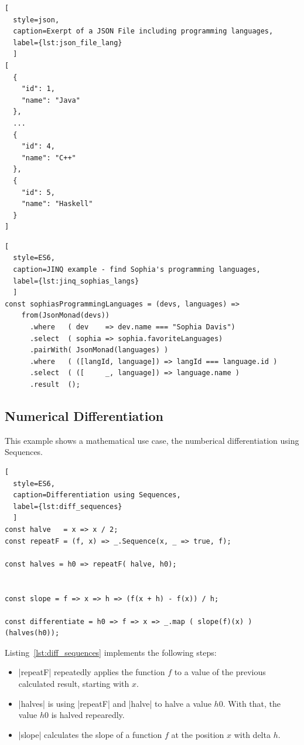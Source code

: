 \begin{lstlisting}[
  style=json, 
  caption=Exerpt of a JSON File including programming languages,
  label={lst:json_file_lang}
  ]
[
  {
    "id": 1,
    "name": "Java"
  },
  ...
  {
    "id": 4,
    "name": "C++"
  },
  {
    "id": 5,
    "name": "Haskell"
  }
]
\end{lstlisting}

\begin{lstlisting}[
  style=ES6, 
  caption=JINQ example - find Sophia's programming languages,
  label={lst:jinq_sophias_langs}
  ]
const sophiasProgrammingLanguages = (devs, languages) =>
    from(JsonMonad(devs))
      .where   ( dev    => dev.name === "Sophia Davis")
      .select  ( sophia => sophia.favoriteLanguages)
      .pairWith( JsonMonad(languages) )
      .where   ( ([langId, language]) => langId === language.id )
      .select  ( ([     _, language]) => language.name )
      .result  ();
\end{lstlisting}

\subsection{Numerical Differentiation}
\label{sub:Numerical Differentiation}
This example shows a mathematical use case, the numberical differentiation using Sequences.

\begin{lstlisting}[
  style=ES6, 
  caption=Differentiation using Sequences,
  label={lst:diff_sequences}
  ]
const halve   = x => x / 2;
const repeatF = (f, x) => _.Sequence(x, _ => true, f);

const halves = h0 => repeatF( halve, h0);


const slope = f => x => h => (f(x + h) - f(x)) / h;

const differentiate = h0 => f => x => _.map ( slope(f)(x) ) (halves(h0));
\end{lstlisting}

Listing~\ref{lst:diff_sequences} implements the following steps: 


\begin{itemize}
  \item{|repeatF| repeatedly applies the function $f$ to a value of the
    previous calculated result, starting with $x$.}
  \item{ |halves| is using |repeatF| and |halve| to halve a value $h0$. With
      that, the value $h0$ is halved repearedly.} 
    \item{|slope| calculates the slope of a function $f$ at the position $x$
      with delta $h$.}
 \end{itemize}

